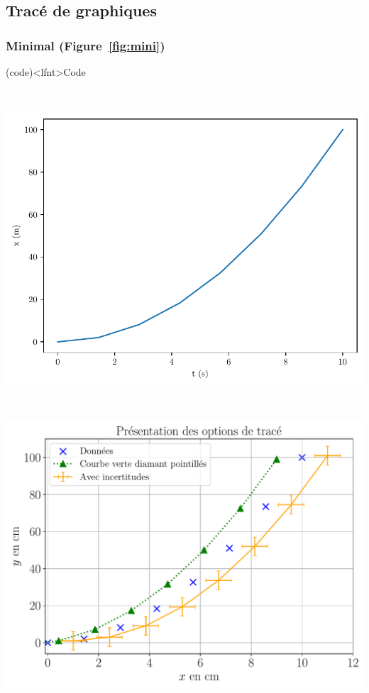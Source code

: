 \documentclass[a4paper, 12pt, garamond]{book}
\begin{document}
\vspace{-15pt}
\subsection{Tracé de graphiques}
\subsubsection{Minimal (Figure~\ref{fig:mini})}
\begin{tcb}(code)<lfnt>{Code}
\end{tcb}

\noindent
\begin{minipage}[t]{.48\linewidth}
	~
	\begin{center}
		\includegraphics[width=\linewidth]{figures/python_plt-1}
		\label{fig:mini}
	\end{center}
\end{minipage}
\hfill
\begin{minipage}[t]{.48\linewidth}
	~
	\begin{center}
		\includegraphics[width=\linewidth]{figures/python_plt-2}
		\label{fig:cplx}
	\end{center}
\end{minipage}
\end{document}
